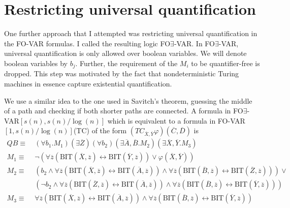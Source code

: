 \section{Restricting universal quantification}\label{sec:restricting-universal-quantification}

One further approach that I attempted was restricting universal quantification in the FO-VAR formulas.
I called the resulting logic FO$\exists$-VAR\@.
In FO$\exists$-VAR, universal quantification is only allowed over boolean variables.
We will denote boolean variables by $b_j$.
Further, the requirement of the $M_i$ to be quantifier-free is dropped.
This step was motivated by the fact that nondeterministic Turing machines in essence capture existential quantification.

We use a similar idea to the one used in Savitch's theorem, guessing the middle of a path and checking if both shorter paths are connected.
A formula in FO$\exists$-VAR$[s(n), s(n)/\log(n)]$ which is equivalent to a formula in FO-VAR$[1, s(n)/\log(n)]$(TC) of the form $\left( TC_{\overline{X}, \overline{Y}}\varphi \right)(\overline{C}, \overline{D})$ is
\[
    \begin{aligned}
        QB \equiv~& (\forall b_{1}.M_{1})(\exists\overline{Z}) (\forall b_{2})(\exists \overline{A}, \overline{B}.M_{2})(\exists\overline{X}, \overline{Y}.M_{3}) \\
        M_{1} \equiv~& \neg(\forall \overline{z} (\text{BIT}(\overline{X}, \overline{z}) \leftrightarrow \text{BIT}(\overline{Y}, \overline{z})) \lor \varphi(\overline{X}, \overline{Y})) \\
        M_{2} \equiv~&(b_{2} \land \forall \overline{z} (\text{BIT}(\overline{X}, \overline{z}) \leftrightarrow \text{BIT}(\overline{A}, \overline{z}))\land \forall \overline{z} (\text{BIT}(\overline{B}, \overline{z}) \leftrightarrow \text{BIT}(\overline{Z}, \overline{z}))) \lor \\
        &(\neg b_{2} \land \forall \overline{z} (\text{BIT}(\overline{Z}, \overline{z}) \leftrightarrow \text{BIT}(\overline{A}, \overline{z}))\land \forall \overline{z} (\text{BIT}(\overline{B}, \overline{z}) \leftrightarrow \text{BIT}(\overline{Y}, \overline{z}))) \\
        M_{3} \equiv~&\forall \overline{z} (\text{BIT}(\overline{X}, \overline{z}) \leftrightarrow \text{BIT}(\overline{A}, \overline{z}))\land \forall \overline{z} (\text{BIT}(\overline{B}, \overline{z}) \leftrightarrow \text{BIT}(\overline{Y}, \overline{z}))
    \end{aligned}
\]
